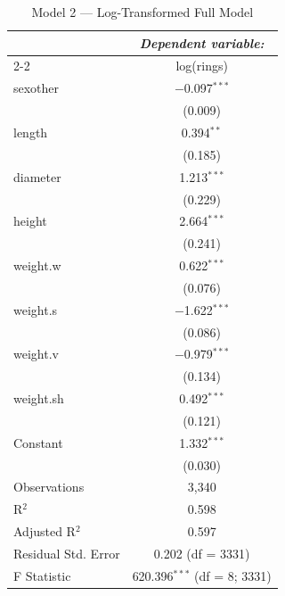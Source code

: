 \documentclass[12pt]{article}
\begin{document}
	\begin{table}[!htbp]
		\centering
		\caption{Model 2 — Log-Transformed Full Model}
		\label{tab:fit2}
		\begin{tabular}{@{\extracolsep{5pt}}lc}
			\toprule
			& \multicolumn{1}{c}{\textit{Dependent variable:}} \\
			\cmidrule(lr){2-2}
			& log(rings) \\
			\midrule
			sexother   & $-$0.097$^{***}$ \\ 
			& (0.009) \\[0.4ex]
			length     & 0.394$^{**}$ \\ 
			& (0.185) \\[0.4ex]
			diameter   & 1.213$^{***}$ \\ 
			& (0.229) \\[0.4ex]
			height     & 2.664$^{***}$ \\ 
			& (0.241) \\[0.4ex]
			weight.w   & 0.622$^{***}$ \\ 
			& (0.076) \\[0.4ex]
			weight.s   & $-$1.622$^{***}$ \\ 
			& (0.086) \\[0.4ex]
			weight.v   & $-$0.979$^{***}$ \\ 
			& (0.134) \\[0.4ex]
			weight.sh  & 0.492$^{***}$ \\ 
			& (0.121) \\[0.4ex]
			Constant   & 1.332$^{***}$ \\ 
			& (0.030) \\[0.4ex]
			\midrule
			Observations        & 3,340 \\ 
			R$^{2}$             & 0.598 \\ 
			Adjusted R$^{2}$    & 0.597 \\ 
			Residual Std. Error & 0.202 (df = 3331) \\ 
			F Statistic         & 620.396$^{***}$ (df = 8; 3331) \\ 
			\bottomrule
		\end{tabular}
	\end{table}
	
\end{document}
